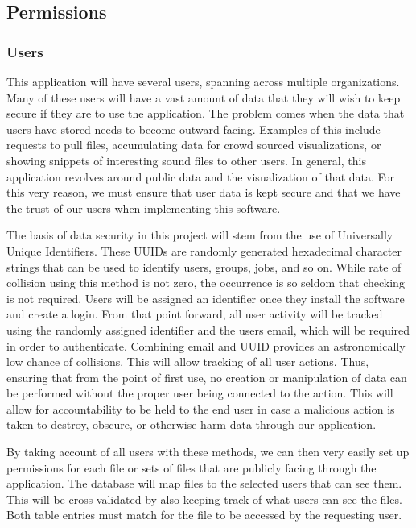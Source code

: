 \subsection{Permissions}
\subsubsection{Users}
This application will have several users, spanning across multiple organizations. Many of these users will have a vast amount of data that they will wish to keep secure if they are to use the application. The problem comes when the data that users have stored needs to become outward facing. Examples of this include requests to pull files, accumulating data for crowd sourced visualizations, or showing snippets of interesting sound files to other users. In general, this application revolves around public data and the visualization of that data. For this very reason, we must ensure that user data is kept secure and that we have the trust of our users when implementing this software.\par
The basis of data security in this project will stem from the use of Universally Unique Identifiers. These UUID\textquotesingle s are randomly generated hexadecimal character strings that can be used to identify users, groups, jobs, and so on. While rate of collision using this method is not zero, the occurrence is so seldom that checking is not required. Users will be assigned an identifier once they install the software and create a login. From that point forward, all user activity will be tracked using the randomly assigned identifier and the user\textquotesingle s email, which will be required in order to authenticate. Combining email and UUID provides an astronomically low chance of collisions. This will allow tracking of all user actions. Thus, ensuring that from the point of first use, no creation or manipulation of data can be performed without the proper user being connected to the action. This will allow for accountability to be held to the end user in case a malicious action is taken to destroy, obscure, or otherwise harm data through our application.\par
By taking account of all users with these methods, we can then very easily set up permissions for each file or sets of files that are publicly facing through the application. The database will map files to the selected users that can see them. This will be cross-validated by also keeping track of what users can see the files. Both table entries must match for the file to be accessed by the requesting user.

